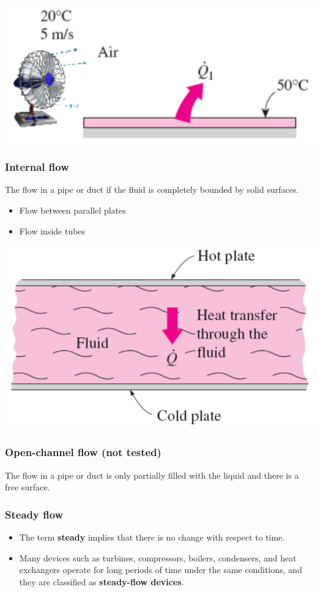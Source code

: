 \documentclass[11pt]{article}
\begin{document}
\begin{center}
\includegraphics[width=.9\linewidth]{./images/external-flow-diagram.png}
\end{center}
\subsubsection{Internal flow}
\label{sec:org87d0359}
The flow in a pipe or duct if the fluid is completely bounded by solid surfaces.
\begin{itemize}
\item Flow between parallel plates
\item Flow inside tubes
\end{itemize}

\begin{center}
\includegraphics[width=.9\linewidth]{./images/internal-flow-diagram.png}
\end{center}
\subsubsection{Open-channel flow (not tested)}
\label{sec:org2650e21}
The flow in a pipe or duct is only partially filled with the liquid and there is a free surface.
\subsubsection{Steady flow}
\label{sec:org5a103cf}
\begin{itemize}
\item The term \textbf{steady} implies that there is no change with respect to time.
\item Many devices such as turbines, compressors, boilers, condensers, and heat exchangers operate for long periods of time under the same conditions, and they are classified as \textbf{steady-flow devices}.
\end{itemize}
\end{document}
